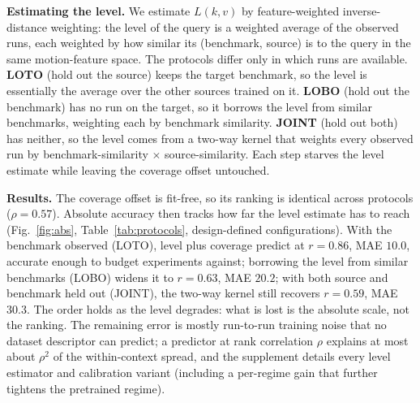 \noindent\textbf{Estimating the level.} We estimate $L(k,v)$ by feature-weighted
inverse-distance weighting: the level of the query is a weighted average of the
observed runs, each weighted by how similar its (benchmark, source) is to the
query in the same motion-feature space. The protocols differ only in which runs
are available. \textbf{LOTO} (hold out the source) keeps the target benchmark, so
the level is essentially the average over the other sources trained on it.
\textbf{LOBO} (hold out the benchmark) has no run on the target, so it borrows the
level from similar benchmarks, weighting each by benchmark similarity. \textbf{JOINT}
(hold out both) has neither, so the level comes from a two-way kernel that weights
every observed run by benchmark-similarity $\times$ source-similarity. Each step
starves the level estimate while leaving the coverage offset untouched.

\begin{table}[t]
\centering
\caption{\textbf{Few-shot absolute prediction under three leakage-safe
protocols.} Each protocol hides part of the predicted (source, benchmark) pair
from the \emph{anchor} fit; the zero-shot coverage rule itself fits nothing and
is not held out. Coverage $\rho$ is the headline fit-free coverage ranking; because it fits
nothing it is identical across protocols. $r$ and MAE are pooled absolute \pck{}
(anchor $+$ coverage). As the anchor is starved from LOTO to LOBO to JOINT,
absolute error widens but the ranking term holds: anchors buy units, coverage
buys order.}
\label{tab:protocols}
\small

\end{table}

\noindent\textbf{Results.} The coverage offset is fit-free, so its ranking is
identical across protocols ($\rho{=}0.57$). Absolute accuracy then tracks how far
the level estimate has to reach (Fig.~\ref{fig:abs}, Table~\ref{tab:protocols},
design-defined configurations). With the benchmark observed (LOTO), level plus coverage
predict at $r{=}0.86$, MAE $10.0$, accurate enough to budget experiments against;
borrowing the level from similar benchmarks (LOBO) widens it to $r{=}0.63$, MAE
$20.2$; with both source and benchmark held out (JOINT), the two-way kernel still
recovers $r{=}0.59$, MAE $30.3$. The order holds as the level degrades: what is
lost is the absolute scale, not the ranking. The remaining error is mostly
run-to-run training noise that no dataset descriptor can predict; a predictor at
rank correlation $\rho$ explains at most about $\rho^2$ of the within-context
spread, and the supplement details every level estimator and calibration variant
(including a per-regime gain that further tightens the pretrained regime).

